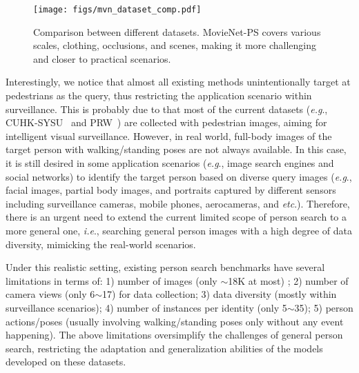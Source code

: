 \documentclass{article}
\def\eg{\emph{e.g}.} \def\Eg{\emph{E.g}.}
\def\ie{\emph{i.e}.} \def\Ie{\emph{I.e}.}
\def\etc{\emph{etc}.} \def\vs{\emph{vs}.}
\begin{document}
\begin{figure}[!t]
\begin{center}
\texttt{[image: figs/mvn\_dataset\_comp.pdf]}
\end{center}
\vspace{-7mm}
\caption{Comparison between different datasets. MovieNet-PS covers various scales, clothing, occlusions, and scenes, making it more challenging and closer to practical scenarios.
}
\vspace{-3mm}
\label{fig:dataset_comp}
\end{figure}

Interestingly, we notice that almost all existing methods unintentionally target at pedestrians as the query, thus restricting the application scenario within surveillance. This is probably due to that most of the current datasets (\eg, CUHK-SYSU~\cite{OIM} and PRW~\cite{PRW}) are collected with pedestrian images, aiming for intelligent visual surveillance. However, in real world, full-body images of the target person with walking/standing poses are not always available. In this case, it is still desired in some application scenarios (\eg, image search engines and social networks) to identify the target person based on diverse query images (\eg, facial images, partial body images, and portraits captured by different sensors including surveillance cameras, mobile phones, aerocameras, and \etc{}). Therefore, there is an urgent need to extend the current limited scope of person search to a more general one, \ie, searching general person images with a high degree of data diversity, mimicking the real-world scenarios.

Under this realistic setting, existing person search benchmarks have several limitations in terms of: 1) number of images (only $\sim$18K at most) ; 2) number of camera views (only 6$\sim$17) for data collection; 3) data diversity (mostly within surveillance scenarios); 4) number of instances per identity (only 5$\sim$35);
5) person actions/poses (usually involving walking/standing poses only without any event happening). The above limitations oversimplify the challenges of general person search, restricting the adaptation and generalization abilities of the models developed on these datasets.
\end{document}
